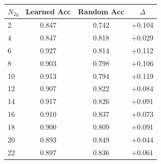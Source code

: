 \begin{tabular}{lccc}
\toprule
$N_{2q}$ & Learned Acc & Random Acc & $\Delta$ \\
\midrule
2 & 0.847 & 0.742 & +0.104 \\
4 & 0.847 & 0.818 & +0.029 \\
6 & 0.927 & 0.814 & +0.112 \\
8 & 0.903 & 0.798 & +0.106 \\
10 & 0.913 & 0.794 & +0.119 \\
12 & 0.907 & 0.822 & +0.084 \\
14 & 0.917 & 0.826 & +0.091 \\
16 & 0.910 & 0.837 & +0.073 \\
18 & 0.900 & 0.809 & +0.091 \\
20 & 0.893 & 0.849 & +0.044 \\
22 & 0.897 & 0.836 & +0.061 \\
\bottomrule
\end{tabular}